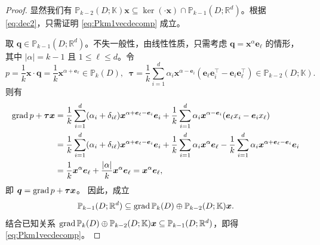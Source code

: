 \begin{proof}
显然我们有 $\mathbb P_{k-2}(D;\mathbb K)\boldsymbol x\subseteq\ker (\cdot \boldsymbol x)\cap \mathbb P_{k-1}(D;\mathbb R^d)$。根据 \eqref{eq:dec2}，只需证明 \eqref{eq:Pkm1vecdecomp} 成立。

取 $\boldsymbol q\in\mathbb P_{k-1}(D; \mathbb R^d)$。不失一般性，由线性性质，只需考虑 $\boldsymbol q=\boldsymbol x^{\alpha}\boldsymbol e_{\ell}$ 的情形，其中 $|\alpha|=k-1$ 且 $1\leq\ell\leq d$。令
$$
p=\frac{1}{k}\boldsymbol x\cdot\boldsymbol q=\frac{1}{k}\boldsymbol x^{\alpha+\boldsymbol e_{\ell}}\in\mathbb P_{k}(D), \;\; \boldsymbol\tau=\frac{1}{k}\sum_{i=1}^d\alpha_i\boldsymbol x^{\alpha-\boldsymbol e_{i}}(\boldsymbol e_{\ell}\boldsymbol e_{i}^{\intercal}-\boldsymbol e_{i}\boldsymbol e_{\ell}^{\intercal})\in\mathbb P_{k-2}(D;\mathbb K).
$$
则有
\begin{align*}
\operatorname{grad} p+\boldsymbol\tau\boldsymbol x& = \frac{1}{k}\sum_{i=1}^d(\alpha_i+\delta_{i\ell})\boldsymbol x^{\alpha+\boldsymbol e_{\ell}-\boldsymbol e_{i}}\boldsymbol e_{i} + \frac{1}{k}\sum_{i=1}^d\alpha_i\boldsymbol x^{\alpha-\boldsymbol e_{i}}(\boldsymbol e_{\ell}x_{i}-\boldsymbol e_{i}x_{\ell}) \\
& = \frac{1}{k}\sum_{i=1}^d(\alpha_i+\delta_{i\ell})\boldsymbol x^{\alpha+\boldsymbol e_{\ell}-\boldsymbol e_{i}}\boldsymbol e_{i} + \frac{1}{k}\sum_{i=1}^d\alpha_i\boldsymbol x^{\alpha}\boldsymbol e_{\ell} - \frac{1}{k}\sum_{i=1}^d\alpha_i\boldsymbol x^{\alpha+\boldsymbol e_{\ell}-\boldsymbol e_{i}}\boldsymbol e_{i} \\
&=\frac{1}{k}\boldsymbol x^{\alpha}\boldsymbol e_{\ell}+\frac{|\alpha|}{k}\boldsymbol x^{\alpha}\boldsymbol e_{\ell}=\boldsymbol x^{\alpha}\boldsymbol e_{\ell},
\end{align*}
即 $\boldsymbol q=\operatorname{grad} p+\boldsymbol\tau\boldsymbol x$。 因此，成立
$$
\mathbb P_{k-1}(D; \mathbb R^d)\subseteq \operatorname{grad} \mathbb P_{k}(D)\oplus\mathbb P_{k-2}(D;\mathbb K)\boldsymbol x.
$$ 
结合已知关系 $\operatorname{grad} \mathbb P_{k}(D)\oplus\mathbb P_{k-2}(D;\mathbb K)\boldsymbol x\subseteq\mathbb P_{k-1}(D; \mathbb R^d)$，即得 \eqref{eq:Pkm1vecdecomp}。
\end{proof}

